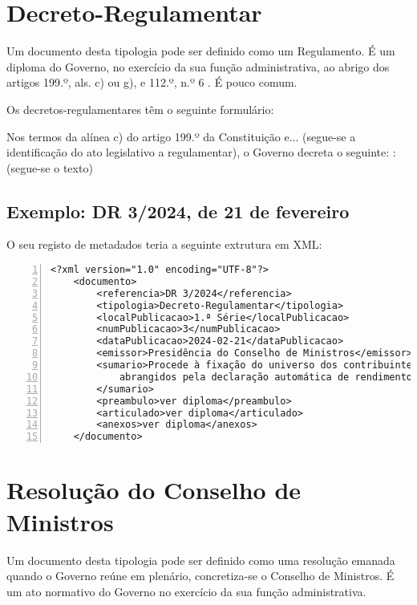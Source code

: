 \section{Decreto-Regulamentar}

Um documento desta tipologia pode ser definido como um Regulamento. É um diploma do Governo, 
no exercício da sua função administrativa, ao abrigo dos artigos 199.º, als. c) ou g), e 
112.º, n.º 6 . É pouco comum.

Os decretos-regulamentares têm o seguinte formulário:

\begin{quoting}
    Nos termos da alínea c) do artigo 199.º da Constituição e... 
    (segue-se a identificação do ato legislativo a regulamentar), 
    o Governo decreta o seguinte: : 
    (segue-se o texto)
\end{quoting}


\subsection{Exemplo: DR 3/2024, de 21 de fevereiro} 
    
O seu registo de metadados teria a seguinte extrutura em XML:
    
\begin{Verbatim}[frame=single, numbers=left, fontsize=\small, commandchars=\\\{\}]
<?xml version="1.0" encoding="UTF-8"?>
    <documento>
        <referencia>DR 3/2024</referencia>
        <tipologia>Decreto-Regulamentar</tipologia>
        <localPublicacao>1.ª Série</localPublicacao>
        <numPublicacao>3</numPublicacao>
        <dataPublicacao>2024-02-21</dataPublicacao>
        <emissor>Presidência do Conselho de Ministros</emissor>
        <sumario>Procede à fixação do universo dos contribuintes 
            abrangidos pela declaração automática de rendimentos.
        </sumario>
        <preambulo>ver diploma</preambulo>
        <articulado>ver diploma</articulado>
        <anexos>ver diploma</anexos>
    </documento>
\end{Verbatim}


\section{Resolução do Conselho de Ministros}

Um documento desta tipologia pode ser definido como uma resolução emanada quando 
o Governo reúne em plenário, concretiza-se o Conselho de Ministros. 
É um ato normativo do Governo no exercício da sua função administrativa.

